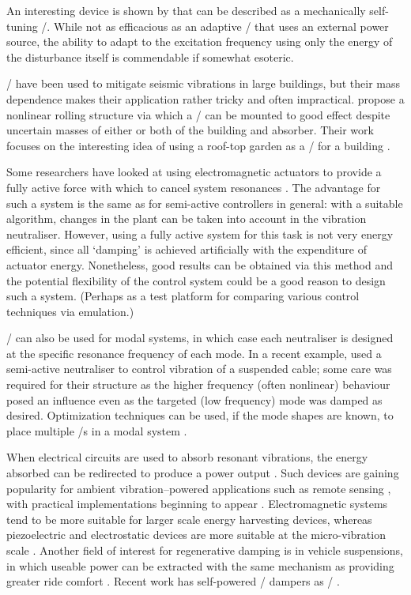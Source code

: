 An interesting device is shown by \textcite{ivers2008} that can be described as a mechanically self-tuning \vibneut/.
While not as efficacious as an adaptive \vibneut/ that uses an external power source, the ability to adapt to the excitation frequency using only the energy of the disturbance itself is commendable if somewhat esoteric.

\Vibneut/ have been used to mitigate seismic vibrations in large buildings, but their mass dependence makes their application rather tricky and often impractical. 
\textcite{matta2008} propose a nonlinear rolling structure via which a \vibneut/ can be mounted to good effect despite uncertain masses of either or both of the building and absorber.
Their work focuses on the interesting idea of using a roof-top garden as a \vibneut/ for a building \cite{matta2008a}.

Some researchers have looked at using electromagnetic actuators to provide a fully active force with which to cancel system resonances \cite{chen2005a,wu2007,kim2008-iecst}.
The advantage for such a system is the same as for semi-active controllers in general: with a suitable algorithm, changes in the plant can be taken into account in the vibration neutraliser.
However, using a fully active system for this task is not very energy efficient, since all `damping' is achieved artificially with the expenditure of actuator energy.
Nonetheless, good results can be obtained via this method and the potential flexibility of the control system could be a good reason to design such a system.
(Perhaps as a test platform for comparing various control techniques via emulation.)

\Vibneut/ can also be used for modal systems, in which case each neutraliser is designed at the specific resonance frequency of each mode.
In a recent example, \textcite{casciati2007} used a semi-active neutraliser to control vibration of a suspended cable; some care was required for their structure as the higher frequency (often nonlinear) behaviour posed an influence even as the targeted (low frequency) mode was damped as desired.
Optimization techniques can be used, if the mode shapes are known, to place multiple \vibneut/s in a modal system \cite{petit2009-jva}.

When electrical circuits are used to absorb resonant vibrations, the energy absorbed can be redirected to produce a power output \cite{stephen2006}.
Such devices are gaining popularity for ambient vibration--powered applications such as remote sensing \cite{arnold2007}, with practical implementations beginning to appear \cite{ferrari2009-sms}.
Electromagnetic systems tend to be more suitable for larger scale energy harvesting devices, whereas piezoelectric and electrostatic devices are more suitable at the micro-vibration scale \cite{beeby2009}.
Another field of interest for regenerative damping is in vehicle suspensions, in which useable power can be extracted with the same mechanism as providing greater ride comfort \cite{graves2000thesis}.
Recent work has self-powered \magnetorh/ dampers as \vibneut/ \cite{choi2009-jva}.

